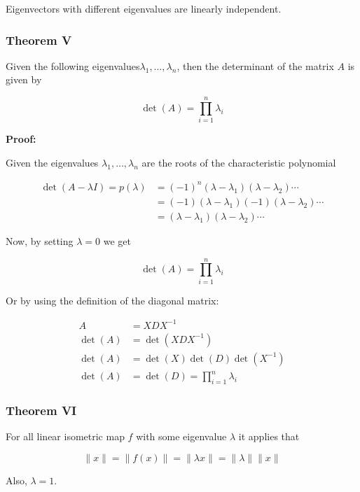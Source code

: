 Eigenvectors with different eigenvalues are linearly independent.

\subsubsection{Theorem V}

Given the following eigenvalues\(\lambda_1, \dots, \lambda_n\), then the 
determinant of the matrix \(A\) is given by 

\[
    \det(A) = \prod_{i = 1}^{n} \lambda_i
\]

\textbf{Proof:}

Given the eigenvalues \(\lambda_1, \dots, \lambda_n\) are the roots of the characteristic polynomial

\begin{align*}
    \det(A - \lambda I) = p (\lambda) &= (-1)^{n}(\lambda - \lambda_1)(\lambda - \lambda_2)\cdots\\
                                      &= (-1)(\lambda - \lambda_1)(-1)(\lambda - \lambda_2)\cdots\\     
                                      &= (\lambda - \lambda_1)(\lambda - \lambda_2)\cdots                       
\end{align*}

Now, by setting \(\lambda = 0\) we get 

\[
    \det(A) = \prod_{i = 1}^{n} \lambda_i
\]

Or by using the definition of the diagonal matrix:

\begin{align*}
    A &= XDX^{-1} \\
   \det(A) &= \det(XDX^{-1})\\
   \det(A) &= \det(X)\det(D)\det(X^{-1})\\
   \det(A) &= \det(D) = \prod_{i = 1}^{n} \lambda_i
\end{align*}

\QED

\subsubsection{Theorem VI}

For all linear isometric map \(f\) with some eigenvalue \(\lambda\) it applies that

\[
    \|x\| = \|f(x)\| = \|\lambda x\| = \|\lambda\|\|x\|
\]

Also, \(\lambda = 1\).
\vspace{\baselineskip}

